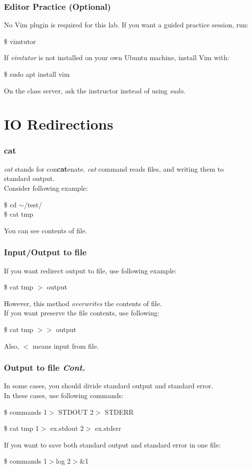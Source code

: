 \documentclass{beamer}
\begin{document}
	\begin{frame}
		\frametitle{Editor Practice (Optional)}
		No Vim plugin is required for this lab. If you want a guided practice session, run:
		\begin{example}
			\$ vimtutor
		\end{example}
		If \textit{vimtutor} is not installed on your own Ubuntu machine, install Vim with:
		\begin{example}
			\$ sudo apt install vim
		\end{example}
		On the class server, ask the instructor instead of using \textit{sudo}.
	\end{frame}

	\section{IO Redirections}

	\begin{frame}
		\frametitle{cat}
		\textit{cat} stands for con\textbf{cat}enate. \textit{cat} command reads files, and writing them to standard output. \\
		Consider following example:
		\begin{example}
			\$ cd $\sim$/test/ \\
			\$ cat tmp
		\end{example}
		You can see contents of file.
	\end{frame}

	\begin{frame}
		\frametitle{Input/Output to file}
		If you want redirect output to file, use following example:
		\begin{example}
			\$ cat tmp $>$ output
		\end{example}
		However, this method \textit{overwrites} the contents of file. \\
		If you want preserve the file contents, use following:
		\begin{example}
			\$ cat tmp $>>$ output
		\end{example}

		Also, $<$ means input from file.
	\end{frame}

	\begin{frame}
		\frametitle{Output to file \textit{Cont.}}
		In some cases, you should divide standard output and standard error. \\
		In these cases, use following commands:
		\begin{example}
			\$ commands 1$>$ STDOUT 2$>$ STDERR
		\end{example}

		\begin{example}
			\$ cat tmp 1$>$ ex.stdout 2$>$ ex.stderr
		\end{example}

		If you want to save both standard output and standard error in one file:
		\begin{example}
			\$ commands 1$>$log 2$>$\&1
		\end{example}
	\end{frame}
\end{document}
